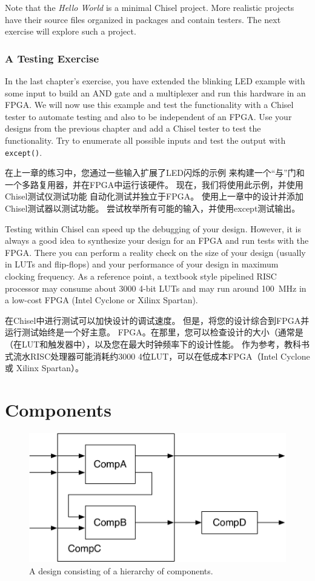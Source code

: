 \documentclass[%
    10pt,
    headinclude, footexclude,
    openright, %
    notitlepage,
    cleardoubleempty,
    headsepline,
    pointlessnumbers,
    bibtotoc, idxtotoc,
    ]{scrbook}
\newcommand{\code}[1]{{\small{\texttt{#1}}}}
\newcommand{\scale}{0.7}
\begin{document}
Note that the \emph{Hello World} is a minimal Chisel project.
More realistic projects have their source files organized in packages and contain testers.
The next exercise will explore such a project.

\subsection{A Testing Exercise}

In the last chapter's exercise, you have extended the blinking LED example with some input
to build an AND gate and a multiplexer and run this hardware in an FPGA.
We will now use this example and test the functionality with a Chisel tester
to automate testing and also to be independent of an FPGA.
Use your designs from the previous chapter and add a Chisel tester to test the functionality.
Try to enumerate all possible inputs and test the output with \code{except()}.

在上一章的练习中，您通过一些输入扩展了LED闪烁的示例
来构建一个“与”门和一个多路复用器，并在FPGA中运行该硬件。
现在，我们将使用此示例，并使用Chisel测试仪测试功能
自动化测试并独立于FPGA。
使用上一章中的设计并添加Chisel测试器以测试功能。
尝试枚举所有可能的输入，并使用except测试输出。

Testing within Chisel can speed up the debugging of your design.
However, it is always a good idea to synthesize your design for an FPGA and run tests
with the FPGA. There you can perform a reality check on the size of your design (usually
in LUTs and flip-flops) and your performance of your design in maximum clocking frequency.
As a reference point, a textbook style pipelined RISC processor may consume about 3000
4-bit LUTs and may run around 100~MHz in a low-cost FPGA (Intel Cyclone or
Xilinx Spartan).


在Chisel中进行测试可以加快设计的调试速度。
但是，将您的设计综合到FPGA并运行测试始终是一个好主意。
FPGA。在那里，您可以检查设计的大小（通常是
（在LUT和触发器中），以及您在最大时钟频率下的设计性能。
作为参考，教科书式流水RISC处理器可能消耗约3000
4位LUT，可以在低成本FPGA（Intel Cyclone或
Xilinx Spartan）。


\chapter{Components}

\begin{figure}
  \centering
  \includegraphics[scale=\scale]{figures/components}
  \caption{A design consisting of a hierarchy of components.}
  \label{fig:components}
\end{figure}
\end{document}
